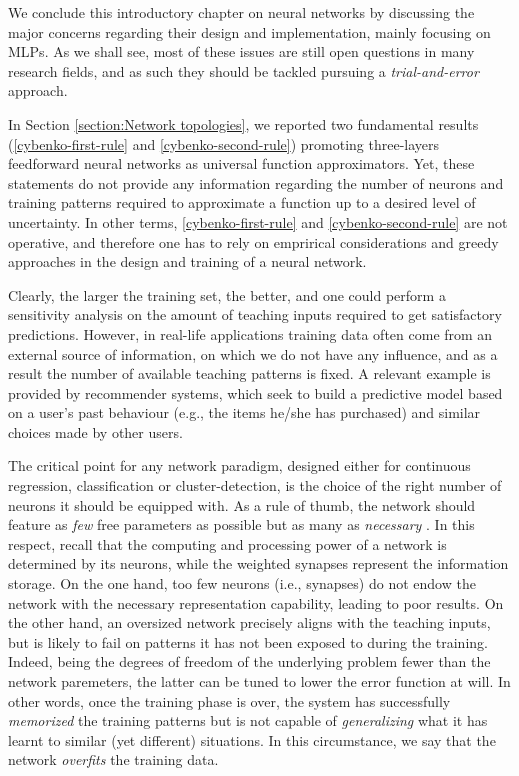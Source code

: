 \documentclass[12pt, a4paper, twoside, openright, notitlepage]{report}
\numberwithin{equation}{chapter}
\theoremstyle{theorem}
\theoremstyle{definition}
\theoremstyle{remark}
\theoremstyle{proposition}
\numberwithin{figure}{chapter}
\begin{document}
		We conclude this introductory chapter on neural networks by discussing the major concerns regarding their design and implementation, mainly focusing on MLPs. As we shall see, most of these issues are still open questions in many research fields, and as such they should be tackled pursuing a \emph{trial-and-error} approach.
		
		In Section \ref{section:Network topologies}, we reported two fundamental results (\ref{cybenko-first-rule} and \ref{cybenko-second-rule}) promoting three-layers feedforward neural networks as universal function approximators. Yet, these statements do not provide any information regarding the number of neurons and training patterns required to approximate a function up to a desired level of uncertainty. In other terms, \ref{cybenko-first-rule} and \ref{cybenko-second-rule} are not operative, and therefore one has to rely on emprirical considerations and greedy approaches in the design and training of a neural network.  
		
		Clearly, the larger the training set, the better, and one could perform a sensitivity analysis on the amount of teaching inputs required to get satisfactory predictions. However, in real-life applications training data often come from an external source of information, on which we do not have any influence, and as a result the number of available teaching patterns is fixed. A relevant example is provided by recommender systems, which seek to build a predictive model based on a user's past behaviour (e.g., the items he/she has purchased) and similar choices made by other users. 
				
		The critical point for any network paradigm, designed either for continuous regression, classification or cluster-detection, is the choice of the right number of neurons it should be equipped with. As a rule of thumb, the network should feature as \emph{few} free parameters as possible but as many as \emph{necessary} \cite{Kri07}. In this respect, recall that the computing and processing power of a network is determined by its neurons, while the weighted synapses represent the information storage. On the one hand, too few neurons (i.e., synapses) do not endow the network with the necessary representation capability, leading to poor results. On the other hand, an oversized network precisely aligns with the teaching inputs, but is likely to fail on patterns it has not been exposed to during the training. Indeed, being the degrees of freedom of the underlying problem fewer than the network paremeters, the latter can be tuned to lower the error function at will. In other words, once the training phase is over, the system has successfully \emph{memorized} the training patterns but is not capable of \emph{generalizing} what it has learnt to similar (yet different) situations. In this circumstance, we say that the network \emph{overfits} the training data. 
		
\end{document}
